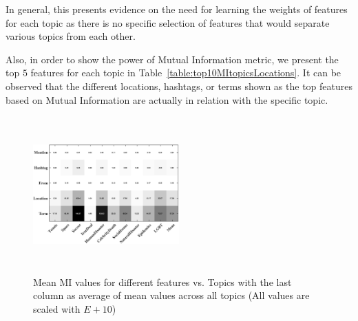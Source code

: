 In general, this presents evidence on the need for learning the weights of features for each topic as there is no specific selection of features that would separate various topics from each other.

Also, in order to show the power of Mutual Information metric, we present the top $5$ features for each topic in Table~\ref{table:top10MItopicsLocations}. It can be observed that the different locations, hashtags, or terms shown as the top features based on Mutual Information are actually in relation with the specific topic.

\begin{figure}[h!]
\centering
\includegraphics[width=0.5\textwidth, height=60mm]{images/avgMI_gray.pdf}
\vspace{-3mm}
\caption{Mean MI values for different features vs. Topics with the last column as average of mean values across all topics (All values are scaled with $E+10$)}
\label{fig:avgMI}
\end{figure}
